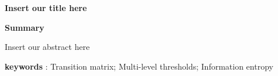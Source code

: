 {\centering\fontsize{18}{16}\selectfont\textbf{{Insert our title here}}
\vspace{10pt} 

\fontsize{13}{10}\selectfont\textbf{{Summary}}\par}

\vspace{10pt}

\fontsize{13}{12.5}\selectfont

\begin{adjustwidth}{1cm}{1cm}
Insert our abstract here



\vspace{15pt}
\textbf{keywords} : Transition matrix; Multi-level thresholds; Information entropy
\end{adjustwidth} 